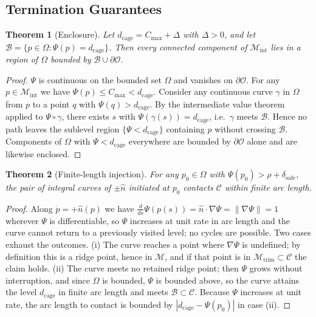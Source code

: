 \documentclass[conference]{IEEEtran}
\newtheorem{theorem}{Theorem}
\begin{document}
\subsection{Termination Guarantees}
\begin{theorem}[Enclosure]
\label{thm:enclosure}
Let $d_{\mathrm{cage}}=C_{\max}+\Delta$ with $\Delta>0$, and let $\mathcal{B}=\{p\in\Omega:\Psi(p)=d_{\mathrm{cage}}\}$. Then every connected component of $\mathcal{M}_{\mathrm{int}}$ lies in a region of $\Omega$ bounded by $\mathcal{B}\cup\partial\mathcal{O}$.
\end{theorem}
\begin{proof}
$\Psi$ is continuous on the bounded set $\Omega$ and vanishes on $\partial\mathcal{O}$. For any $p\in\mathcal{M}_{\mathrm{int}}$ we have $\Psi(p)\le C_{\max}<d_{\mathrm{cage}}$. Consider any continuous curve $\gamma$ in $\Omega$ from $p$ to a point $q$ with $\Psi(q)>d_{\mathrm{cage}}$. By the intermediate value theorem applied to $\Psi\circ\gamma$, there exists $s$ with $\Psi(\gamma(s))=d_{\mathrm{cage}}$, i.e.\ $\gamma$ meets $\mathcal{B}$. Hence no path leaves the sublevel region $\{\Psi<d_{\mathrm{cage}}\}$ containing $p$ without crossing $\mathcal{B}$. Components of $\Omega$ with $\Psi<d_{\mathrm{cage}}$ everywhere are bounded by $\partial\mathcal{O}$ alone and are likewise enclosed.
\end{proof}
\begin{theorem}[Finite-length injection]
\label{thm:injection}
For any $p_0\in\Omega$ with $\Psi(p_0)>\rho+\delta_{\mathrm{safe}}$, the pair of integral curves of $\pm\hat{n}$ initiated at $p_0$ contacts $\mathcal{C}$ within finite arc length.
\end{theorem}
\begin{proof}
Along $\dot{p}=+\hat{n}(p)$ we have $\tfrac{d}{ds}\Psi(p(s))=\hat{n}\cdot\nabla\Psi=\|\nabla\Psi\|=1$ wherever $\Psi$ is differentiable, so $\Psi$ increases at unit rate in arc length and the curve cannot return to a previously visited level; no cycles are possible. Two cases exhaust the outcomes. (i) The curve reaches a point where $\nabla\Psi$ is undefined; by definition this is a ridge point, hence in $\mathcal{M}$, and if that point is in $\mathcal{M}_{\mathrm{trim}}\subset\mathcal{C}$ the claim holds. (ii) The curve meets no retained ridge point; then $\Psi$ grows without interruption, and since $\Omega$ is bounded, $\Psi$ is bounded above, so the curve attains the level $d_{\mathrm{cage}}$ in finite arc length and meets $\mathcal{B}\subset\mathcal{C}$. Because $\Psi$ increases at unit rate, the arc length to contact is bounded by $|d_{\mathrm{cage}}-\Psi(p_0)|$ in case (ii).
\end{proof}
\end{document}
